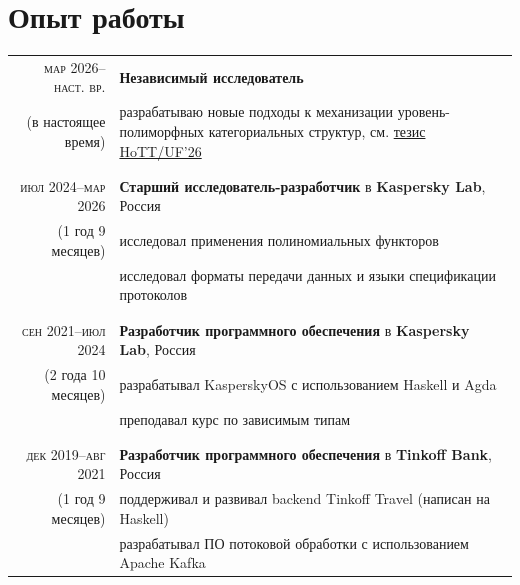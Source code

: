 \documentclass[a4paper,11pt]{article}
\begin{document}
  \pagebreak
  \section{Опыт работы}
    \begin{longtable}{r|p{}}
      \textsc{мар 2026--наст. вр.} & \large \sffamily \textbf{Независимый исследователь}                                     \\
      \nopagebreak
      (в настоящее время) & разрабатываю новые подходы к механизации уровень-полиморфных категориальных структур,
                            см. \href{https://hott-uf.github.io/2026/abstracts/HoTTUF_2026_paper_10.pdf}{тезис HoTT/UF'26}   \\
      \\&\\
      \textsc{июл 2024--мар 2026} & \large \sffamily \textbf{Старший исследователь-разработчик} в \textbf{Kaspersky Lab}, Россия   \\
      \nopagebreak
      (1 год 9 месяцев) & исследовал применения полиномиальных функторов                                                   \\
                         & исследовал форматы передачи данных и языки спецификации протоколов                                     \\
      \\&\\
      \textsc{сен 2021--июл 2024} & \large \sffamily \textbf{Разработчик программного обеспечения} в \textbf{Kaspersky Lab}, Россия   \\
      \nopagebreak
      (2 года 10 месяцев) & разрабатывал KasperskyOS с использованием Haskell и Agda                                            \\
                           & преподавал курс по зависимым типам                                                        \\
      \\&\\
      \textsc{дек 2019--авг 2021} & \large \sffamily \textbf{Разработчик программного обеспечения} в \textbf{Tinkoff Bank}, Россия     \\
      \nopagebreak
      (1 год 9 месяцев) & поддерживал и развивал backend Tinkoff Travel (написан на Haskell)                       \\
                         & разрабатывал ПО потоковой обработки с использованием Apache Kafka                                    \\

\end{longtable}
\end{document}
